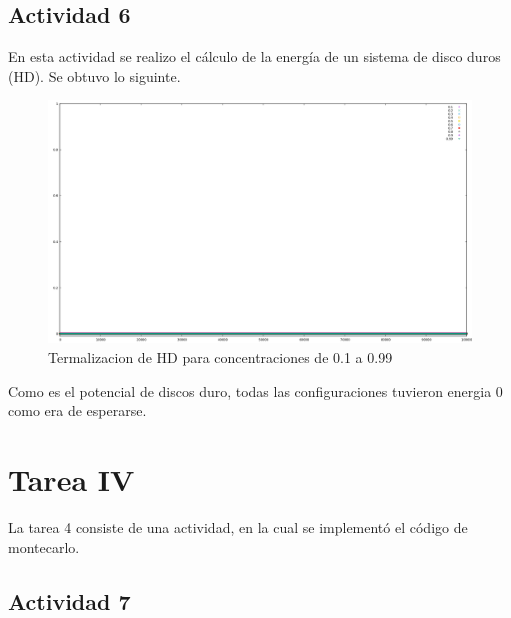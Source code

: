 \documentclass[12pt,letterpaper]{article}
\begin{document}
	\subsection*{Actividad 6}
	En esta actividad se realizo el cálculo de la energía de un sistema de disco duros (HD). Se obtuvo lo siguinte.
	\begin{figure}[H]
		\centering
		\includegraphics[width = 0.75\linewidth]{Terma.png}
		\caption{Termalizacion de HD para concentraciones de 0.1 a 0.99}
	\end{figure}
	Como es el potencial de discos duro, todas las configuraciones tuvieron energia 0 como era de esperarse.
\pagebreak
\section*{Tarea IV}
La tarea 4 consiste de una actividad, en la cual se implementó el código de montecarlo.
\subsection*{Actividad 7}
\end{document}
